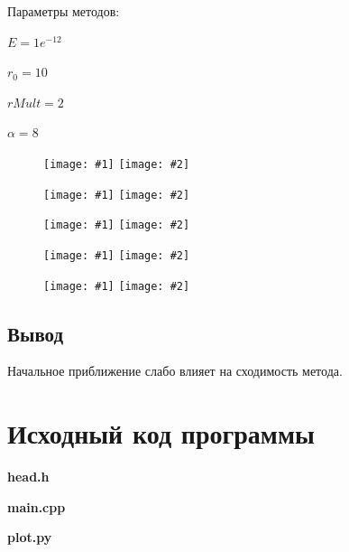 \documentclass[12pt, a4paper]{article}
\newcommand{\myCodeInput}[3]{
{\bf #2}

}
\newcommand{\inputTwoImages}[2]{
\begin{figure}[htbp!]
    \noindent
        \texttt{[image: \#1]}
        \texttt{[image: \#2]}
\end{figure}

}
\begin{document}
Параметры методов:
\begin{trivlist}
	\item $ E = 1e^{-12} $
	\item $ r_0 = 10 $
	\item $ rMult = 2 $
	\item $ \alpha = 8 $
\end{trivlist}

\inputTwoImages{../pics/Rosenbrock_Q1_1.png}{../pics/Rosenbrock_Q1_2.png}
\inputTwoImages{../pics/Rosenbrock_Q2_1.png}{../pics/Rosenbrock_Q2_2.png}
\inputTwoImages{../pics/Rosenbrock_Q3_1.png}{../pics/Rosenbrock_Q3_2.png}
\inputTwoImages{../pics/Rosenbrock_Q4_1.png}{../pics/Rosenbrock_Q4_2.png}
\inputTwoImages{../pics/Rosenbrock_Q5_1.png}{../pics/Rosenbrock_Q5_2.png}
\subsection{Вывод}

Начальное приближение слабо влияет на сходимость метода.



\section{Исходный код программы}
\myCodeInput{c++}{head.h}{../head.h}
\myCodeInput{c++}{main.cpp}{../main.cpp}
\myCodeInput{python}{plot.py}{../plot.py}
\end{document}
